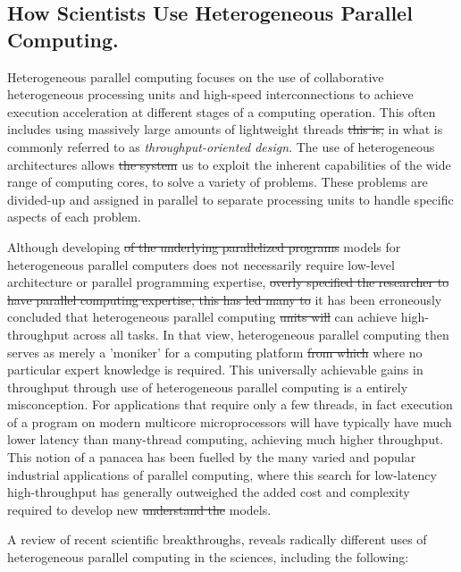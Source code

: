 \documentclass[10pt]{article}[draft]
\begin{document}
\newpage
\begin{center}
	\section{How Scientists Use Heterogeneous Parallel Computing.}
\end{center}
Heterogeneous parallel computing  focuses on the use of collaborative heterogeneous processing units and high-speed interconnections to achieve execution acceleration at different stages of a computing operation. This often includes using massively large amounts of lightweight threads \st{this is,} in what is commonly referred to as \emph{throughput-oriented design}. The use of heterogeneous architectures allows \st{the system} us to exploit the inherent capabilities of the wide range of computing cores, to solve a variety of problems. These problems are divided-up and assigned in parallel to separate processing units to handle specific aspects of each problem.  

Although developing \st{of the underlying  parallelized programs}  models for heterogeneous parallel computers does  not necessarily require low-level architecture or parallel programming expertise, \st{overly specified the researcher to have parallel computing  expertise, this has led many to} it has been erroneously concluded that heterogeneous parallel computing \st{units will} can achieve high-throughput across all tasks. In that view, heterogeneous parallel computing  then serves as merely a 'moniker' for a computing platform \st{from which} where no particular expert knowledge is required. This universally achievable gains in throughput through use of heterogeneous parallel computing is a entirely misconception.  For applications that require only a few threads, in fact execution of a program on modern multicore microprocessors will have typically have much lower latency than many-thread computing, achieving much higher throughput. This notion of a panacea has been fuelled by the many {varied} and popular industrial applications of parallel computing, where this search for low-latency high-throughput has generally outweighed the added cost and complexity required to develop new \st{understand the} models. 

A review of recent scientific breakthroughs, reveals radically different uses of heterogeneous parallel computing in the sciences, including the following:
\end{document}
